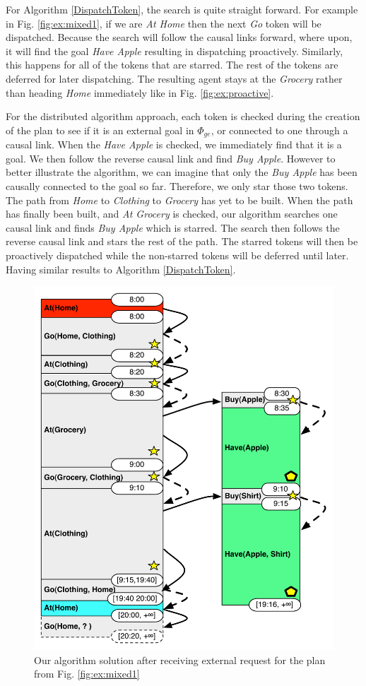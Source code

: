 For Algorithm \ref{DispatchToken}, the search is quite straight
forward. For example in Fig. \ref{fig:ex:mixed1}, if we are {\em At
Home} then the next {\em Go} token will be dispatched. Because the
search will follow the causal links forward, where upon, it will find
the goal {\em Have Apple} resulting in dispatching proactively.
Similarly, this happens for all of the tokens that are starred. The
rest of the tokens are deferred for later dispatching. The resulting
agent stays at the {\em Grocery} rather than heading {\em Home}
immediately like in Fig. \ref{fig:ex:proactive}.

For the distributed algorithm approach, each token is checked during
the creation of the plan to see if it is an external goal in
$\Phi_{ge}$, or connected to one through a causal link. When the {\em
Have Apple} is checked, we immediately find that it is a goal. We then
follow the reverse causal link and find {\em Buy Apple}.  However to
better illustrate the algorithm, we can imagine that only the {\em Buy
Apple} has been causally connected to the goal so far. Therefore, we
only star those two tokens. The path from {\em Home} to {\em Clothing}
to {\em Grocery} has yet to be built. When the path has finally been
built, and {\em At Grocery} is checked, our algorithm searches one
causal link and finds {\em Buy Apple} which is starred. The search
then follows the reverse causal link and stars the rest of the
path. The starred tokens will then be proactively dispatched while the
non-starred tokens will be deferred until later. Having similar
results to Algorithm \ref{DispatchToken}.

\begin{figure}
  \centering
  \includegraphics[width=0.8\columnwidth]{figs/example_MixedUpdate}
  \caption{Our algorithm solution after receiving external request for the plan from Fig. \ref{fig:ex:mixed1}}
  \label{fig:ex:mixed2}
\end{figure}

